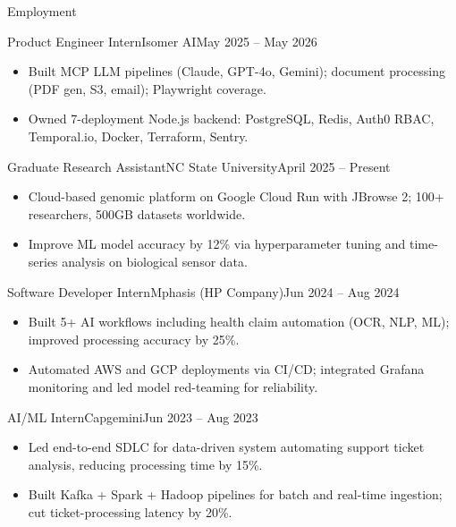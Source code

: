 \documentclass[]{mcdowellcv}
\begin{document}
\makeheader

\begin{cvsection}{Employment}
  \begin{cvsubsection}{Product Engineer Intern}{Isomer AI}{May 2025 -- May 2026}
    \begin{itemize}
      \item Built MCP LLM pipelines (Claude, GPT-4o, Gemini); document processing (PDF gen, S3, email); Playwright coverage.
      \item Owned 7-deployment Node.js backend: PostgreSQL, Redis, Auth0 RBAC, Temporal.io, Docker, Terraform, Sentry.
    \end{itemize}
    \vspace{-1.5pt}
  \end{cvsubsection}

  \begin{cvsubsection}{Graduate Research Assistant}{NC State University}{April 2025 -- Present}
    \begin{itemize}
      \item Cloud-based genomic platform on Google Cloud Run with JBrowse 2; 100+ researchers, 500GB datasets worldwide.
      \item Improve ML model accuracy by 12\% via hyperparameter tuning and time-series analysis on biological sensor data.
    \end{itemize}
    \vspace{-1.5pt}
  \end{cvsubsection}

  \begin{cvsubsection}{Software Developer Intern}{Mphasis (HP Company)}{Jun 2024 -- Aug 2024}
    \begin{itemize}
      \item Built 5+ AI workflows including health claim automation (OCR, NLP, ML); improved processing accuracy by 25\%.
      \item Automated AWS and GCP deployments via CI/CD; integrated Grafana monitoring and led model red-teaming for reliability.
    \end{itemize}
    \vspace{-1.5pt}
  \end{cvsubsection}

  \begin{cvsubsection}{AI/ML Intern}{Capgemini}{Jun 2023 -- Aug 2023}
    \begin{itemize}
      \item Led end-to-end SDLC for data-driven system automating support ticket analysis, reducing processing time by 15\%.
      \item Built Kafka + Spark + Hadoop pipelines for batch and real-time ingestion; cut ticket-processing latency by 20\%.
    \end{itemize}
    \vspace{-1.5pt}
  \end{cvsubsection}
\end{cvsection}
\end{document}
